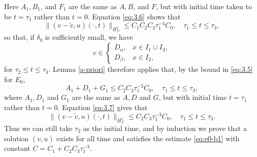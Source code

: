 \documentclass[a4paper,oneside,11pt]{article}
\numberwithin{equation}{section}
\begin{document}
Here \({A}_{1}, {B}_{1}\), and \({F}_{1}\) are the same as \(A, B\), and \(F\), but with initial time taken to be \(t = {\tau }_{1}\) rather than \(t = 0\).
Equation \eqref{eq:3.6} shows that
\[
\|(v-\tilde{v},u)(\cdot,t)\|_{H^1_\Sigma}\leq C_1{C}_{2}{C}_{3}{\tau }_{1}^{-4}C_0,\quad \tau_1\leq t\leq \tau_3,
\]
so that, if \({\delta }_{0}\) is sufficiently small, we have
\begin{equation}\label{eq:3.4-1}
	v \in 
\begin{cases}
D_\alpha, & x \in I_1 \cup I_3, \\
D_\beta, & x \in I_2,
\end{cases} 
\end{equation}
for \({\tau }_{2} \leq  t \leq  {\tau }_{3}\). 
Lemma \ref{a-priori} therefore applies that, by the bound in \eqref{eq:3.5} for \({E}_{0}\),
\begin{equation}\label{eq:3.7}
	{A}_{1} + {D}_{1} + {G}_{1} \leq  {C}_{2}{C}_{3}{\tau }_{1}^{-3}C_0,\quad{\tau }_{1} \leq  t \leq  {\tau }_{3},
\end{equation}
where \({{A}_{1},{D}_{1}}\) and \({G}_{1}\) are the same as \(A, D\) and \(G\), but with initial time \(t = {\tau }_{1}\) rather than \(t = 0\).
Equation \eqref{eq:3.7} gives that
\begin{equation}\label{eq:3.8}
	\|(v-\tilde{v}, u)(\cdot,t)\|_{H^1_\Sigma}\leq {C}_{2}{C}_{3}{\tau }_{1}^{-3}C_0,\quad \tau_1\leq t\leq \tau_3.
\end{equation}
Thus we can still take $\tau_2$ as the initial time, and by induction we prove that a solution \((v,u)\) exists for all time and satisfies the estimate \eqref{eq:e0-b1} with constant \(C = {C}_{1} + {C}_{2}{C}_{3}{\tau }_{1}^{-3}\).
\end{document}
